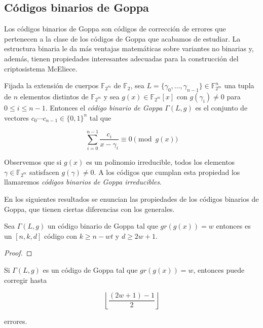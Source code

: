 \subsection{Códigos binarios de Goppa}

Los códigos binarios de Goppa son códigos de corrección de errores que pertenecen a la clase de los códigos de Goppa que acabamos de estudiar. La estructura binaria le da más ventajas matemáticas sobre variantes no binarias y, además, tienen propiedades interesantes adecuadas para la construcción del criptosistema McEliece.

\begin{definition}

    Fijada la extensión de cuerpos $\mathbb{F}_{2^m}$ de $\mathbb{F}_2$, sea $L = \{ \gamma_0, ..., \gamma_{n-1} \} \in \mathbb{F}_{2^m}^n$ una tupla de $n$ elementos distintos de $\mathbb{F}_{2^m}$ y sea $g(x) \in \mathbb{F}_{2^m}[x]$ con $g(\gamma_i) \neq 0$ para $0 \leq i \leq n - 1$. Entonces el \emph{código binario de Goppa} $\Gamma(L,g)$ es el conjunto de vectores $c_0 \cdots c_{n-1} \in \{ 0, 1 \}^n$ tal que 

    \begin{equation}
        \sum_{i=0}^{n-1} \frac{c_i}{x - \gamma_i} \equiv 0 \pmod{g(x)}
    \end{equation}
\end{definition}

Observemos que si $g(x)$ es un polinomio irreducible, todos los elementos $\gamma \in \mathbb{F}_{2^m}$ satisfacen $g(\gamma) \neq 0$. A los códigos que cumplan esta propiedad los llamaremos \emph{códigos binarios de Goppa irreducibles}.

En los siguientes resultados se enuncian las propiedades de los códigos binarios de Goppa, que tienen ciertas diferencias con los generales.

\begin{theorem}
    Sea $\Gamma(L,g)$ un código binario de Goppa tal que $gr(g(x)) = w$ entonces es un $[n, k, d]$ código con $k \geq n - wt$ y $d \geq 2w + 1$.
\end{theorem}

\begin{proof}
    
\end{proof}

\begin{corollary}
    Si $\Gamma(L,g)$ es un código de Goppa tal que $gr(g(x)) = w$, entonces puede corregir hasta

    $$\left\lfloor \frac{(2w + 1) - 1}{2} \right\rfloor $$

    errores.
\end{corollary}

